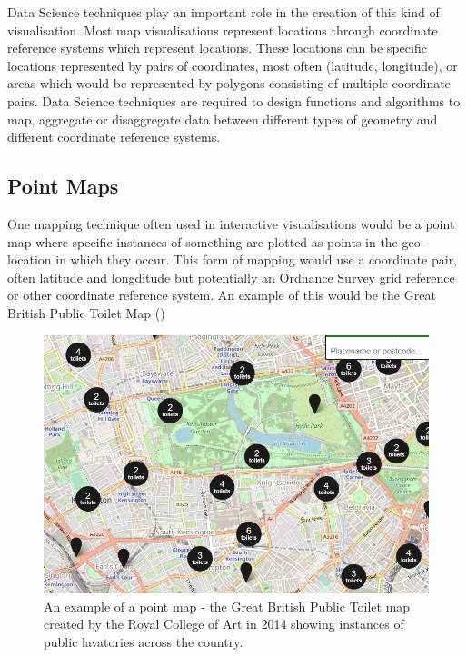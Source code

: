 Data Science techniques play an important role in the creation of this kind of visualisation. Most map visualisations represent locations through coordinate reference systems which represent locations. These locations can be specific locations represented by pairs of coordinates, most often (latitude, longitude), or areas which would be represented by polygons consisting of multiple coordinate pairs. Data Science techniques are required to design functions and algorithms to map, aggregate or disaggregate data between different types of geometry and different coordinate reference systems. 
	
\subsection{Point Maps}
One mapping technique often used in interactive visualisations would be a point map where specific instances of something are plotted as points in the geo-location in which they occur. This form of mapping would use a coordinate pair, often latitude and longditude but potentially an Ordnance Survey grid reference or other coordinate reference system. An example of this would be the Great British Public Toilet Map (\cite{rca14})

\begin{figure}[H]
\centering
\includegraphics[scale=0.5]{figures/toilets_point}
\decoRule
\caption{An example of a point map - the Great British Public Toilet map created by the Royal College of Art in 2014 showing instances of public lavatories across the country.}
\end{figure}

